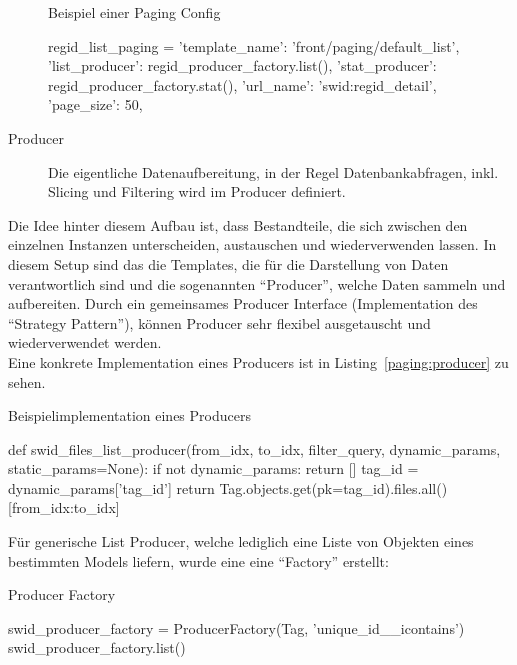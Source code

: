 \begin{description}
\begin{listing}
\caption{Beispiel einer Paging Config}
\begin{pythoncode}
regid_list_paging = {
    'template_name': 'front/paging/default_list',
    'list_producer': regid_producer_factory.list(),
    'stat_producer': regid_producer_factory.stat(),
    'url_name': 'swid:regid_detail',
    'page_size': 50,
}
\end{pythoncode}
\end{listing}

\item[Producer]
Die eigentliche Datenaufbereitung, in der Regel Datenbankabfragen, inkl. Slicing und Filtering wird im Producer definiert.

\end{description}

Die Idee hinter diesem Aufbau ist, dass Bestandteile, die sich zwischen den einzelnen
Instanzen unterscheiden, austauschen und wiederverwenden lassen. In diesem Setup sind das die Templates, die für die Darstellung von Daten verantwortlich sind und die sogenannten \enquote{Producer}, welche Daten sammeln und aufbereiten.
Durch ein gemeinsames Producer Interface (Implementation des \enquote{Strategy Pattern}), können Producer sehr flexibel ausgetauscht und wiederverwendet werden.\\
Eine konkrete Implementation eines Producers ist in Listing~\ref{paging:producer} zu sehen.

\begin{listing}
\caption{Beispielimplementation eines Producers}
\label{paging:producer}
\begin{pythoncode}
def swid_files_list_producer(from_idx, to_idx, filter_query, dynamic_params, static_params=None):
    if not dynamic_params:
        return []
    tag_id = dynamic_params['tag_id']
    return Tag.objects.get(pk=tag_id).files.all()[from_idx:to_idx]
\end{pythoncode}
\end{listing}

Für generische List Producer, welche lediglich eine Liste von Objekten eines bestimmten Models liefern, wurde eine eine \enquote{Factory} erstellt:

\begin{listing}
\caption{Producer Factory}
\begin{pythoncode}
swid_producer_factory = ProducerFactory(Tag, 'unique_id__icontains')
swid_producer_factory.list()
\end{pythoncode}
\end{listing}


